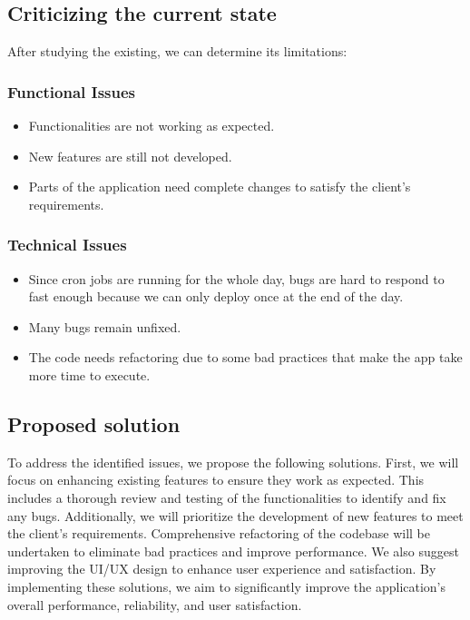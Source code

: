 \subsection{Criticizing the current state}
After studying the existing, we can determine its limitations:

\subsubsection{Functional Issues}
\begin{itemize}
    \item Functionalities are not working as expected.
    \item New features are still not developed.
    \item Parts of the application need complete changes to satisfy the client's requirements.
\end{itemize}

\subsubsection{Technical Issues}
\begin{itemize}
    \item Since cron jobs are running for the whole day, bugs are hard to respond to fast enough because we can only deploy once at the end of the day.
    \item Many bugs remain unfixed.
    \item The code needs refactoring due to some bad practices that make the app take more time to execute.
\end{itemize}

\subsection{Proposed solution}
To address the identified issues, we propose the following solutions. First, we will focus on enhancing existing features to ensure they work as expected. This includes a thorough review and testing of the functionalities to identify and fix any bugs. Additionally, we will prioritize the development of new features to meet the client's requirements. Comprehensive refactoring of the codebase will be undertaken to eliminate bad practices and improve performance. We also suggest improving the UI/UX design to enhance user experience and satisfaction. By implementing these solutions, we aim to significantly improve the application's overall performance, reliability, and user satisfaction.
\newpage

